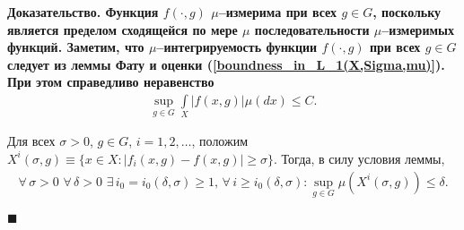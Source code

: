 \documentclass{report}
\newenvironment{Proof}{\par\noindent\bf Доказательство.\rm}{ $\blacksquare$\par}
\begin{document}
\begin{Proof}
Функция $f(\cdot,g)$ $\mu$--измерима при всех $g\in G$, поскольку является пределом сходящейся по мере $\mu$ последовательности $\mu$--измеримых функций. Заметим, что $\mu$--интегрируемость
функции $f(\cdot,g)$ при всех $g\in G$ следует из леммы Фату и оценки (\ref{boundness_in_L_1(X,Sigma,mu)}). При этом справедливо неравенство
\begin{gather*}
\sup\limits_{g\in G}\int\limits_X|f(x,g)|\mu(dx)\leqslant C.
\end{gather*}

Для всех $\sigma>0$, $g\in G$, $i=1,2,\dots$, положим $X^i(\sigma,g)\equiv\{x\in X:|f_i(x,g)-f(x,g)|\geqslant\sigma\}$. Тогда, в силу
условия леммы,
\begin{gather}\label{muXiconvergence}
\forall\,\sigma>0\,\,\forall\,\delta>0\,\,\exists\,i_0=i_0(\delta,\sigma)\geqslant1,\,\forall\,i\geqslant i_0(\delta,\sigma):\sup\limits_{g\in G}\mu(X^i(\sigma,g))\leqslant\delta.
\end{gather}


\end{Proof}
\end{document}
